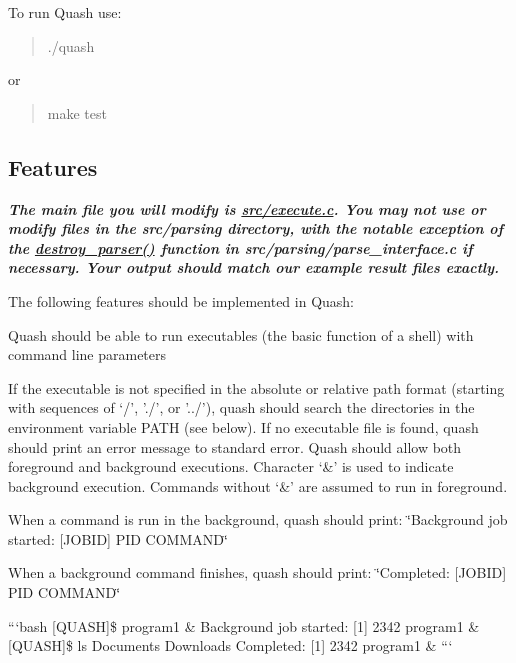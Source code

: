 To run Quash use\-: \begin{quotation}
{\ttfamily ./quash}

\end{quotation}
or \begin{quotation}
{\ttfamily make test}

\end{quotation}


\subsection*{Features}

{\itshape {\bfseries The main file you will modify is \hyperlink{execute_8c}{src/execute.\-c}. You may not use or modify files in the src/parsing directory, with the notable exception of the \hyperlink{parsing__interface_8h_a659361d40550d9776b6ea7fa69a836ce}{destroy\-\_\-parser()} function in src/parsing/parse\-\_\-interface.\-c if necessary. Your output should match our example result files exactly.}}

The following features should be implemented in Quash\-:


\begin{DoxyItemize}
\item Quash should be able to run executables (the basic function of a shell) with command line parameters
\item If the executable is not specified in the absolute or relative path format (starting with sequences of ‘/’, './', or '../'), quash should search the directories in the environment variable P\-A\-T\-H (see below). If no executable file is found, quash should print an error message to standard error. Quash should allow both foreground and background executions. Character ‘\&’ is used to indicate background execution. Commands without ‘\&’ are assumed to run in foreground.
\begin{DoxyItemize}
\item When a command is run in the background, quash should print\-: \char`\"{}\-Background
      job started\-: \mbox{[}\-J\-O\-B\-I\-D\mbox{]}    P\-I\-D    C\-O\-M\-M\-A\-N\-D\char`\"{}
\item When a background command finishes, quash should print\-: \char`\"{}\-Completed\-:
      \mbox{[}\-J\-O\-B\-I\-D\mbox{]}    P\-I\-D    C\-O\-M\-M\-A\-N\-D\char`\"{}
\end{DoxyItemize}
\end{DoxyItemize}

```bash \mbox{[}Q\-U\-A\-S\-H\mbox{]}\$ program1 \& Background job started\-: \mbox{[}1\mbox{]} 2342 program1 \& \mbox{[}Q\-U\-A\-S\-H\mbox{]}\$ ls Documents Downloads Completed\-: \mbox{[}1\mbox{]} 2342 program1 \& ```


